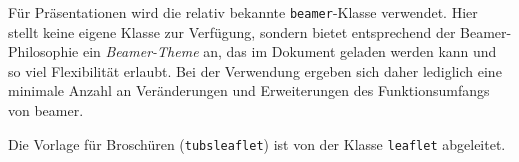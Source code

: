 Für Präsentationen wird die relativ bekannte \texttt{beamer}-Klasse verwendet.
Hier stellt \tubslatex keine eigene Klasse zur Verfügung,
sondern bietet entsprechend der Beamer-Philosophie ein \emph{Beamer-Theme} an,
das im Dokument geladen werden kann und so viel Flexibilität erlaubt.
Bei der Verwendung ergeben sich daher lediglich eine minimale Anzahl an
Veränderungen und Erweiterungen des Funktionsumfangs von beamer.

Die Vorlage für Broschüren (\texttt{tubsleaflet}) ist
von der Klasse \texttt{leaflet} abgeleitet.


